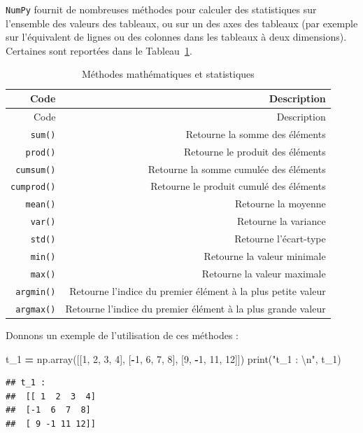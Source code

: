 \documentclass[12pt,]{book}
\newenvironment{Shaded}{\begin{snugshade}}{\end{snugshade}}
\newcommand{\DecValTok}[1]{\textcolor[rgb]{0.00,0.00,0.81}{#1}}
\newcommand{\CharTok}[1]{\textcolor[rgb]{0.31,0.60,0.02}{#1}}
\newcommand{\StringTok}[1]{\textcolor[rgb]{0.31,0.60,0.02}{#1}}
\newcommand{\OperatorTok}[1]{\textcolor[rgb]{0.81,0.36,0.00}{\textbf{#1}}}
\newcommand{\BuiltInTok}[1]{#1}
\newcommand{\NormalTok}[1]{#1}
\numberwithin{equation}{section}
\numberwithin{countremarque}{section}
\begin{document}
\texttt{NumPy} fournit de nombreuses méthodes pour calculer des
statistiques sur l'ensemble des valeurs des tableaux, ou sur un des axes
des tableaux (par exemple sur l'équivalent de lignes ou des colonnes
dans les tableaux à deux dimensions). Certaines sont reportées dans le
Tableau~\ref{tab:numpy-maths-methodes}.

\begin{longtable}[]{@{}rr@{}}
\caption{\label{tab:numpy-maths-methodes} Méthodes mathématiques et
statistiques}\tabularnewline
\toprule
Code & Description\tabularnewline
\midrule
\endfirsthead
\toprule
Code & Description\tabularnewline
\midrule
\endhead
\texttt{sum()} & Retourne la somme des éléments\tabularnewline
\texttt{prod()} & Retourne le produit des éléments\tabularnewline
\texttt{cumsum()} & Retourne la somme cumulée des
éléments\tabularnewline
\texttt{cumprod()} & Retourne le produit cumulé des
éléments\tabularnewline
\texttt{mean()} & Retourne la moyenne\tabularnewline
\texttt{var()} & Retourne la variance\tabularnewline
\texttt{std()} & Retourne l'écart-type\tabularnewline
\texttt{min()} & Retourne la valeur minimale\tabularnewline
\texttt{max()} & Retourne la valeur maximale\tabularnewline
\texttt{argmin()} & Retourne l'indice du premier élément à la plus
petite valeur\tabularnewline
\texttt{argmax()} & Retourne l'indice du premier élément à la plus
grande valeur\tabularnewline
\bottomrule
\end{longtable}

Donnons un exemple de l'utilisation de ces méthodes :

\begin{Shaded}
\begin{Highlighting}[]
\NormalTok{t_1 }\OperatorTok{=}\NormalTok{ np.array([[}\DecValTok{1}\NormalTok{, }\DecValTok{2}\NormalTok{, }\DecValTok{3}\NormalTok{, }\DecValTok{4}\NormalTok{], [}\OperatorTok{-}\DecValTok{1}\NormalTok{, }\DecValTok{6}\NormalTok{, }\DecValTok{7}\NormalTok{, }\DecValTok{8}\NormalTok{], [}\DecValTok{9}\NormalTok{, }\OperatorTok{-}\DecValTok{1}\NormalTok{, }\DecValTok{11}\NormalTok{, }\DecValTok{12}\NormalTok{]])}
\BuiltInTok{print}\NormalTok{(}\StringTok{"t_1 : }\CharTok{\textbackslash{}n}\StringTok{"}\NormalTok{, t_1)}
\end{Highlighting}
\end{Shaded}

\begin{lstlisting}
## t_1 : 
##  [[ 1  2  3  4]
##  [-1  6  7  8]
##  [ 9 -1 11 12]]
\end{lstlisting}
\end{document}

